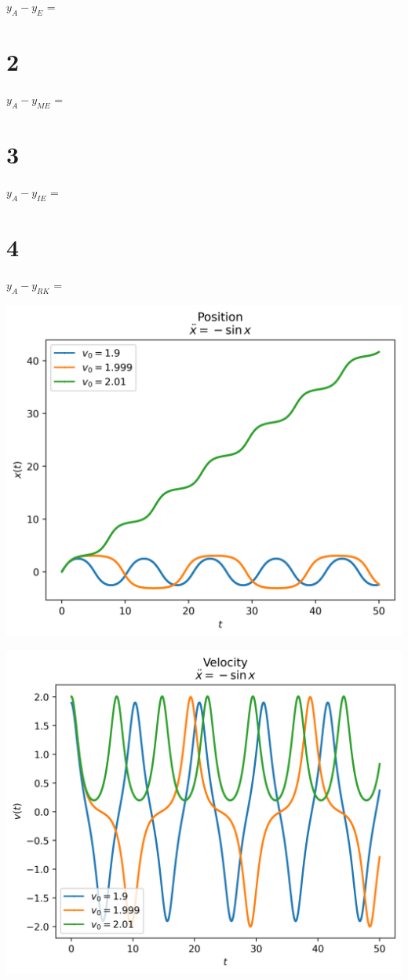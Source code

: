 \documentclass{article}
\begin{document}
$y_A - y_E$ = 

\section*{2}

$y_A - y_{ME}$ = 

\section*{3}

$y_A - y_{IE}$ = 

\section*{4}

$y_A - y_{RK}$ = 

\begin{center}
    \includegraphics*[scale=0.8]{7x.png}
\end{center}

\begin{center}
    \includegraphics*[scale=0.8]{7v.png}
\end{center}
\end{document}
